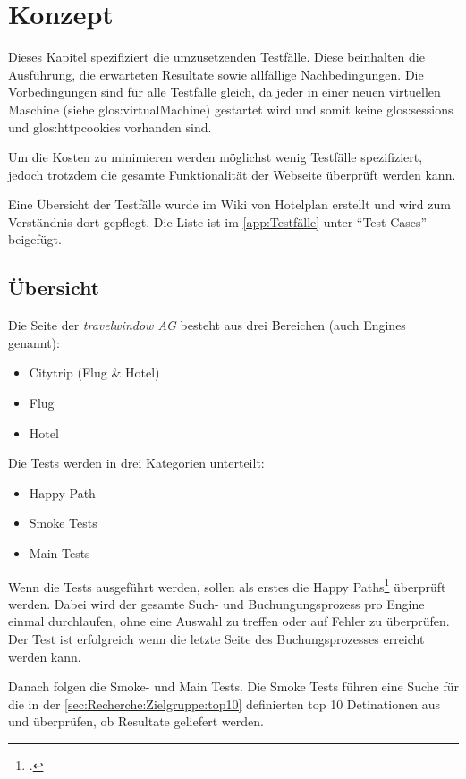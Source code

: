 
\chapter{Konzept}
Dieses Kapitel spezifiziert die umzusetzenden Testfälle. Diese beinhalten die Ausführung, die erwarteten Resultate sowie allfällige Nachbedingungen. Die Vorbedingungen sind für alle Testfälle gleich, da jeder in einer neuen virtuellen Maschine (siehe \Gls{glos:virtualMachine}) gestartet wird und somit keine \Glspl{glos:session} und \Glspl{glos:httpcookie} vorhanden sind.

Um die Kosten zu minimieren werden möglichst wenig Testfälle spezifiziert, jedoch trotzdem die gesamte Funktionalität der Webseite überprüft werden kann.

Eine Übersicht der Testfälle wurde im Wiki von Hotelplan erstellt und wird zum Verständnis dort gepflegt. Die Liste ist im \cref{app:Testfälle}  unter "`Test Cases"' beigefügt.

\section{Übersicht}
Die Seite der \textit{travelwindow AG} besteht aus drei Bereichen (auch Engines genannt):
\begin{itemize}
\item Citytrip (Flug \& Hotel)
\item Flug
\item Hotel
\end{itemize}

Die Tests werden in drei Kategorien unterteilt:
\begin{itemize}
\item Happy Path
\item Smoke Tests
\item Main Tests
\end{itemize}

Wenn die Tests ausgeführt werden, sollen als erstes die Happy Paths\footcite{Happy_path_-_Wikipedia_the_free_encyclopedia_2015-07-30} überprüft werden. Dabei wird der gesamte Such- und Buchungungsprozess pro Engine einmal durchlaufen, ohne eine Auswahl zu treffen oder auf Fehler zu überprüfen. Der Test ist erfolgreich wenn die letzte Seite des Buchungsprozesses erreicht werden kann.

Danach folgen die Smoke- und Main Tests. Die Smoke Tests führen eine Suche für die in der \cref{sec:Recherche:Zielgruppe:top10}  definierten top 10 Detinationen aus und überprüfen, ob Resultate geliefert werden.

